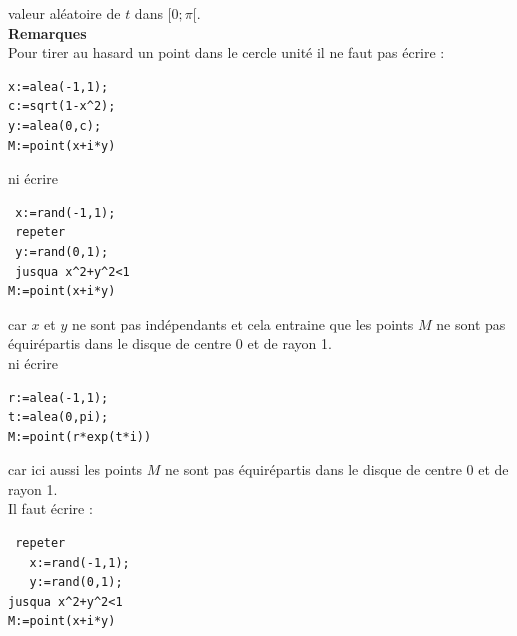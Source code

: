 \documentclass[a4paper,11pt]{book}
\begin{document}
valeur al\'eatoire de $t$ dans $[0;\pi[$.\\
{\bf Remarques} \\
Pour tirer au hasard un point dans le cercle unit\'e il ne faut pas \'ecrire :
\begin{verbatim}
x:=alea(-1,1);
c:=sqrt(1-x^2);
y:=alea(0,c);
M:=point(x+i*y)
\end{verbatim}
ni \'ecrire 
\begin{verbatim}
 x:=rand(-1,1);
 repeter
 y:=rand(0,1);
 jusqua x^2+y^2<1 
M:=point(x+i*y)
\end{verbatim}
car $x$ et $y$ ne sont pas ind\'ependants et cela entraine que les points $M$ 
ne sont pas \'equir\'epartis dans le disque de centre 0 et de rayon 1.\\ 
ni \'ecrire 
\begin{verbatim}
r:=alea(-1,1);
t:=alea(0,pi);
M:=point(r*exp(t*i))
\end{verbatim}
car ici aussi les points $M$ ne sont pas \'equir\'epartis dans le disque de 
centre 0 et de rayon 1.\\
Il faut \'ecrire :
\begin{verbatim}
 repeter
   x:=rand(-1,1);
   y:=rand(0,1);
jusqua x^2+y^2<1 
M:=point(x+i*y)
\end{verbatim}
\end{document}
